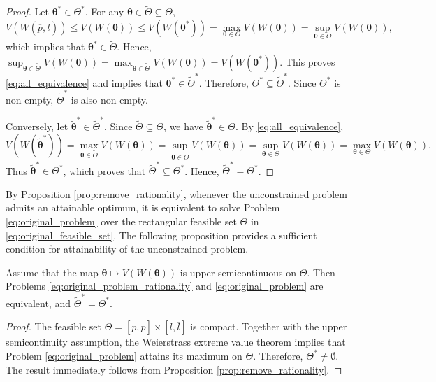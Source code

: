 \documentclass[a4paper,12pt]{article}
\begin{document}
\begin{proof}
Let ${\bm\theta}^*\in\Theta^*$. For any ${\bm\theta}\in\tilde{\Theta}\subseteq\Theta$,
\begin{equation*}
V\left(W\left(\overline{p},\overline{l}\right)\right)\leq V\left(W\left({\bm\theta}\right)\right)\leq V\left(W\left({\bm\theta}^*\right)\right)=\max_{{\bm\theta}\in\Theta}V\left(W\left({\bm\theta}\right)\right)=\sup_{{\bm\theta}\in\Theta}V\left(W\left({\bm\theta}\right)\right),
\end{equation*}
which implies that ${\bm\theta}^*\in\tilde{\Theta}$. Hence, $\sup_{{\bm\theta}\in\tilde{\Theta}}V\left(W\left({\bm\theta}\right)\right)=\max_{{\bm\theta}\in\tilde{\Theta}}V\left(W\left({\bm\theta}\right)\right)=V\left(W\left({\bm\theta}^*\right)\right)$. This proves \eqref{eq:all_equivalence} and implies that ${\bm\theta}^*\in\tilde{\Theta}^*$. Therefore, $\Theta^*\subseteq\tilde{\Theta}^*$. Since $\Theta^*$ is non-empty, $\tilde{\Theta}^*$ is also non-empty.

Conversely, let $\tilde{\bm\theta}^*\in\tilde{\Theta}^*$. Since $\tilde{\Theta}\subseteq\Theta$, we have $\tilde{\bm\theta}^*\in\Theta$. By \eqref{eq:all_equivalence},
\begin{equation*}
V\left(W\left(\tilde{\bm\theta}^*\right)\right)=\max_{{\bm\theta}\in\tilde{\Theta}}V\left(W\left({\bm\theta}\right)\right)=\sup_{{\bm\theta}\in\tilde{\Theta}}V\left(W\left({\bm\theta}\right)\right)=\sup_{{\bm\theta}\in\Theta}V\left(W\left({\bm\theta}\right)\right)=\max_{{\bm\theta}\in\Theta}V\left(W\left({\bm\theta}\right)\right).
\end{equation*}
Thus $\tilde{\bm\theta}^*\in\Theta^*$, which proves that $\tilde{\Theta}^*\subseteq\Theta^*$. Hence, $\tilde{\Theta}^*=\Theta^*$.
\end{proof}
\noindent
By Proposition \ref{prop:remove_rationality}, whenever the unconstrained problem admits an attainable optimum, it is equivalent to solve Problem \eqref{eq:original_problem} over the rectangular feasible set $\Theta$ in \eqref{eq:original_feasible_set}. The following proposition provides a sufficient condition for attainability of the unconstrained problem.
\begin{proposition}\label{coro:upper_semicontinuous}
Assume that the map ${\bm\theta}\mapsto V\left(W\left({\bm\theta}\right)\right)$ is upper semicontinuous on $\Theta$. Then Problems \eqref{eq:original_problem_rationality} and \eqref{eq:original_problem} are equivalent, and $\tilde{\Theta}^*=\Theta^*$.
\end{proposition}
\begin{proof}
The feasible set $\Theta=\left[\underline{p},\overline{p}\right]\times\left[\underline{l},\overline{l}\right]$ is compact. Together with the upper semicontinuity assumption, the Weierstrass extreme value theorem implies that Problem \eqref{eq:original_problem} attains its maximum on $\Theta$. Therefore, $\Theta^*\neq\emptyset$. The result immediately follows from Proposition \ref{prop:remove_rationality}.
\end{proof}
\end{document}
